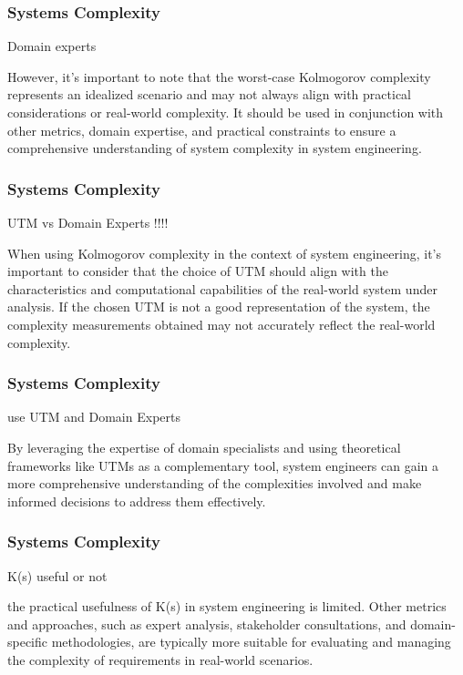 \newpage
\begin{frame}
\frametitle{Systems Complexity }
\begin{block}{ Domain experts }


However, it's important to note that the worst-case Kolmogorov complexity represents an idealized scenario and may not always align with practical considerations or real-world complexity. It should be used in conjunction with other metrics, domain expertise, and practical constraints to ensure a comprehensive understanding of system complexity in system engineering.

\end{block}
\end{frame}


\newpage
\begin{frame}
\frametitle{Systems Complexity }
\begin{block}{ UTM vs Domain Experts !!!! }


When using Kolmogorov complexity in the context of system engineering, it's important to consider that the choice of UTM should align with the characteristics and computational capabilities of the real-world system under analysis. If the chosen UTM is not a good representation of the system, the complexity measurements obtained may not accurately reflect the real-world complexity.
\end{block}
\end{frame}


\newpage
\begin{frame}
\frametitle{Systems Complexity }
\begin{block}{ use UTM  and Domain Experts }


By leveraging the expertise of domain specialists and using theoretical frameworks like UTMs as a complementary tool, system engineers can gain a more comprehensive understanding of the complexities involved and make informed decisions to address them effectively.
\end{block}
\end{frame}



\newpage
\begin{frame}
\frametitle{Systems Complexity }
\begin{block}{  K(s) useful or not  }

the practical usefulness of K(s) in system engineering is limited. Other metrics and approaches, such as expert analysis, stakeholder consultations, and domain-specific methodologies, are typically more suitable for evaluating and managing the complexity of requirements in real-world scenarios.

\end{block}
\end{frame}


